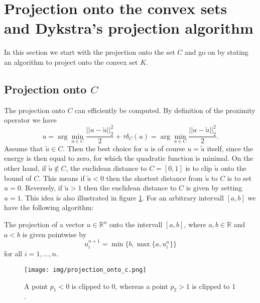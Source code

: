\section{Projection onto the convex sets and Dykstra's projection algorithm}

    In this section we start with the projection onto the set $C$ and go on by stating an algorithm to project onto the convex set $K$.

    \subsection{Projection onto $C$}

    The projection onto $C$ can efficiently be computed. By definition of the proximity operator we have
        $$
            u = \arg\min_{u \in C} \frac{||u-\tilde{u}||_{2}^{2}}{2} + \tau \delta_{C}(u) = \arg\min_{u \in C} \frac{||u - \tilde{u}||_{2}^{2}}{2}.
        $$
    Assume that $\tilde{u} \in C$. Then the best choice for $u$ is of course $u = \tilde{u}$ itself, since the energy  is then equal to zero, for which the quadratic function is minimal. On the other hand, if $\tilde{u} \notin C$, the euclidean distance to $C = [0, 1]$ is to clip $\tilde{u}$ onto the bound of $C$. This means if $\tilde{u} < 0$ then the shortest distance from $\tilde{u}$ to $C$ is to set $u = 0$. Reversely, if $\tilde{u} > 1$ then the euclidean distance to $C$ is given by setting $u = 1$. This idea is also illustrated in figure \ref{fig:projection_onto_c}. For an arbitrary intervall $[a, b]$ we have the following algorithm:

    \begin{algorithm}[Clipping]
        The projection of a vector $u \in \mathbb{R}^{n}$ onto the intervall $[a, b]$, where $a,b \in \mathbb{R}$ and $a < b$ is given pointwise by
            \begin{equation}
                u^{n+1}_{i} = \min\{b, \max \{ a, u^{n}_{i} \} \}
                \label{ex:clipping}
            \end{equation}
        for all $i = 1, ..., n$.
    \end{algorithm}

    \begin{figure}[ht]
        \centering
        \texttt{[image: img/projection\_onto\_c.png]}
        \caption[Clipping to the set $C$]{\label{fig:projection_onto_c} A point $p_{1} < 0$ is clipped to $0$, whereas a point $p_{2} > 1$ is clipped to $1$.}
    \end{figure}

